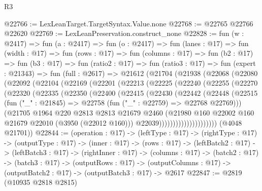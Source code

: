 \begin{lexlean}{R3}
\begin{coremodule}
@22766 := LexLeanTarget.TargetSyntax.Value.none
@22768 := @22765 @22766 @22620
@22769 := LexLeanPreservation.construct_none
@22828 := fun (w : @2417) =>
  fun (a : @2417) =>
  fun (o : @2417) =>
  fun (lanes : @17) =>
  fun (width : @17) =>
  fun (rows : @17) =>
  fun (columns : @17) =>
  fun (b2 : @17) =>
  fun (b3 : @17) =>
  fun (ratio2 : @17) =>
  fun (ratio3 : @17) =>
  fun (expert : @21343) =>
  fun (full : @2617) =>
  @21612
    (@21704
      (@21938
        (@22068
          (@22080
            (@22092
              (@22104
                (@22169
                  (@22201
                    (@22213
                      (@22225
                        (@22240
                          (@22255
                            (@22270
                              (@22320
                                (@22335
                                  (@22350
                                    (@22400
                                      (@22415
                                        (@22430
                                          (@22442
                                            (@22448
                                              (@22515
                                                (fun ("_" : @21845) =>
                                                @22758 (fun ("_" : @22759) => @22768 @22769)))
                                              (@21705
                                                @1964
                                                @220
                                                @2813
                                                @2813
                                                @21679
                                                @2460
                                                (@21980
                                                  @160
                                                  @22002
                                                  @160
                                                  @21679
                                                  @22010
                                                  (@3950 (@22012 @160)))
                                                @22039)))))))))))))))))))))
      (@4048 @21701))
@22844 := (operation : @17) ->
  (leftType : @17) ->
  (rightType : @17) ->
  (outputType : @17) ->
  (inner : @17) ->
  (rows : @17) ->
  (leftBatch2 : @17) ->
  (leftBatch3 : @17) ->
  (rightInner : @17) ->
  (columns : @17) ->
  (batch2 : @17) ->
  (batch3 : @17) ->
  (outputRows : @17) ->
  (outputColumns : @17) -> (outputBatch2 : @17) -> (outputBatch3 : @17) -> @2617
@22847 := @2819 (@10935 @2818 @2815)

\end{coremodule}
\end{lexlean}
